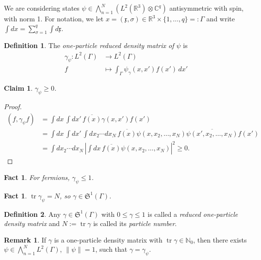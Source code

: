 \documentclass[11pt]{amsart}
\newcommand{\vocab}[1]{\emph{#1}}
\newcommand{\N}{\mathbb{N}}
\newcommand{\R}{\mathbb{R}}
\newcommand{\C}{\mathbb{C}}
\newtheorem{claim}[thm]{Claim}
\newtheorem{fact}[thm]{Fact}
\theoremstyle{definition}
\theoremstyle{definition}
\newtheorem{defn}{Definition}
\theoremstyle{definition}
\newtheorem*{rmk}{Remark}
\numberwithin{equation}{section}
\begin{document}
We are considering states $\psi\in\bigwedge_{n=1}^N(L^2(\R^3)\otimes\C^q)$ antisymmetric with spin, with norm 1.
 For notation, we let $x=(\mathfrak{x},\sigma)\in\R^3\times\{1,\ldots,q\}=:\Gamma$ and write $\int dx=\sum_{\sigma=1}^q\int d\mathfrak{x}$. %
\begin{defn}
The \vocab{one-particle reduced density matrix of $\psi$} is 
\begin{align*}
\gamma_\psi:L^2(\Gamma)&\longrightarrow L^2(\Gamma)\\
f&\longmapsto \int_\Gamma \psi_\gamma(x,x')f(x')\,dx'
\end{align*}
\end{defn}
\begin{claim}
$\gamma_\psi\ge0$.
\end{claim}
\begin{proof}
\begin{align*}
(f,\gamma_\psi f)&=\int dx\,\int dx'\,\overline{f(x)}\gamma(x,x')f(x')\\
&=\int dx\,\int dx'\,\int dx_2\cdots dx_N\,\overline{f(x)}\psi(x,x_2,\ldots,x_N)\overline{\psi(x',x_2,\ldots,x_N)}f(x')\\
&=\int dx_2\cdots dx_N\,\left|\int dx\,\overline{f(x)}\psi(x,x_2,\ldots,x_N)\right|^2\ge0.
\end{align*}
\end{proof}

\begin{fact}
For fermions, $\gamma_\psi\le1$.
\end{fact}

\begin{fact}
$\operatorname{tr}\gamma_\psi=N$, so $\gamma\in\mathfrak{S}^1(\Gamma)$.
\end{fact}


\begin{defn}
Any $\gamma\in\mathfrak{S}^1(\Gamma)$ with $0\le\gamma\le1$ is called a \emph{reduced one-particle density matrix} and $N:=\operatorname{tr}\gamma$ is called its \vocab{particle number}.
\end{defn}

\begin{rmk}
If $\gamma$ is a one-particle density matrix with $\operatorname{tr}\gamma\in\N_0$, then there exists $\psi\in\bigwedge_{n=1}^NL^2(\Gamma)$, $\|\psi\|=1$, such that $\gamma=\gamma_\psi$.
\end{rmk}
\end{document}
